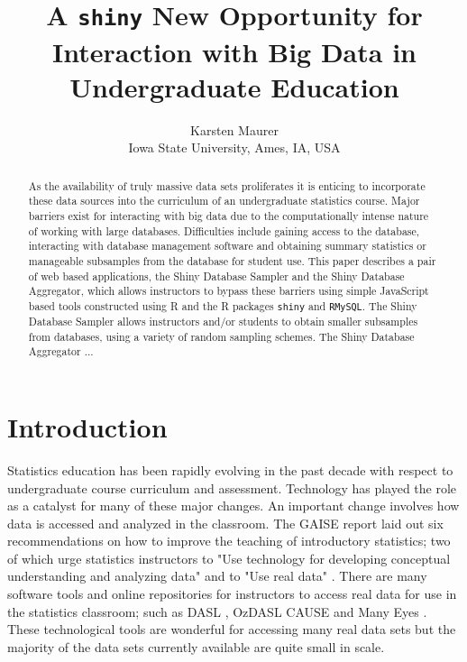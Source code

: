\documentclass{article}\usepackage[]{graphicx}\usepackage[]{color}
\begin{document}
\tableofcontents
\newpage





\title{A \texttt{shiny} New Opportunity for Interaction with Big Data in Undergraduate Education}
\author{Karsten Maurer \\ Iowa State University, Ames, IA, USA}

\maketitle



 \begin{abstract}
As the availability of truly massive data sets proliferates it is enticing to incorporate these data sources into the curriculum of an undergraduate statistics course.  Major barriers exist for interacting with big data due to the computationally intense nature of working with large databases.  Difficulties include gaining access to the database, interacting with database management software and obtaining summary statistics or manageable subsamples from the database for student use.  This paper describes a pair of web based applications, the Shiny Database Sampler and the Shiny Database Aggregator, which allows instructors to bypass these barriers using simple JavaScript based tools constructed using R and the R packages \texttt{shiny} and \texttt{RMySQL}. The Shiny Database Sampler allows instructors and/or students to obtain smaller subsamples from databases, using a variety of random sampling schemes. The Shiny Database Aggregator ...
 \end{abstract}

\section{Introduction}

Statistics education has been rapidly evolving in the past decade with respect to undergraduate course curriculum and assessment. Technology has played the role as a catalyst for many of these major changes.  An important change involves how data is accessed and analyzed in the classroom.   The GAISE report laid out six recommendations on how to improve the teaching of introductory statistics; two of which urge statistics instructors to "Use technology for developing conceptual understanding and analyzing data" and to "Use real data" \citep{GAISEcollege}.   There are many software tools and online repositories for instructors to access real data for use in the statistics classroom; such as DASL \citep{DASL} , OzDASL \citep{OzDASL} CAUSE \citep{CAUSErepo}  and Many Eyes \citep{ManyEyes}.  These technological tools are wonderful for accessing many real data sets but the majority of the data sets currently available are quite small in scale.\\
\end{document}
